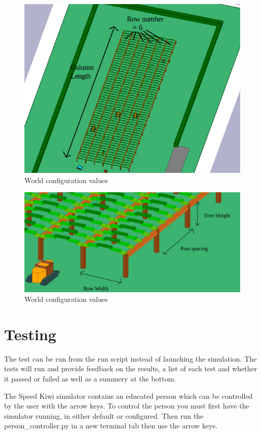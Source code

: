 \documentclass{article}
\begin{document}
\begin{figure}[ht]\centering
\includegraphics[scale=0.65]{config1}
\caption{World configuration values}
\label{fig:results}
\end{figure}

\begin{figure}[ht]\centering
\includegraphics[scale=0.35]{config2}
\caption{World configuration values}
\label{fig:results}
\end{figure}


\section{Testing}

The test can be run from the run script instead of launching the simulation. The tests will run and provide feedback on the results, a list of each test and whether it passed or failed as well as a summery at the bottom.

The Speed Kiwi simulator contains an educated person which can be controlled by the user with the arrow keys.
To control the person you must first have the simulator running, in either default or configured.
Then run the person\_controller.py in a new terminal tab then use the arrow keys.
\end{document}
